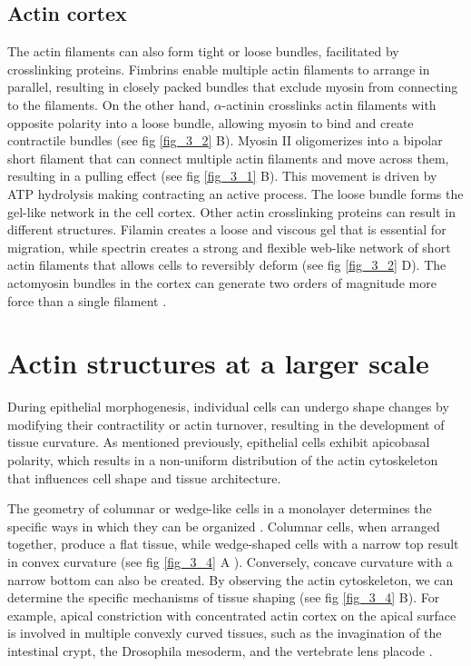 \hypertarget{actin-cortex}{%
	\subsection{Actin cortex}\label{actin-cortex}}

The actin filaments can also form tight or loose bundles, facilitated by crosslinking proteins. Fimbrins enable multiple actin filaments to arrange in parallel, resulting in closely packed bundles that exclude myosin from connecting to the filaments. On the other hand, $\alpha$-actinin crosslinks actin filaments with opposite polarity into a loose bundle, allowing myosin to bind and create contractile bundles (see fig \ref{fig_3_2} B). Myosin II oligomerizes into a bipolar short filament that can connect multiple actin filaments and move across them, resulting in a pulling effect (see fig \ref{fig_3_1} B). This movement is driven by ATP hydrolysis making contracting an active process. The loose bundle forms the gel-like network in the cell cortex. Other actin crosslinking proteins can result in different structures. Filamin creates a loose and viscous gel that is essential for migration, while spectrin creates a strong and flexible web-like network of short actin filaments that allows cells to reversibly deform (see fig \ref{fig_3_2} D). The actomyosin bundles in the cortex can generate two orders of magnitude more force than a single filament \cite{clarke2021}.


\hypertarget{actin-structures-at-a-larger-scale}{%
\section{Actin structures at a larger scale}\label{actin-structures-at-a-larger-scale}}

During epithelial morphogenesis, individual cells can undergo shape changes by modifying their contractility or actin turnover, resulting in the development of tissue curvature. As mentioned previously, epithelial cells exhibit apicobasal polarity, which results in a non-uniform distribution of the actin cytoskeleton that influences cell shape and tissue architecture.

The geometry of columnar or wedge-like cells in a monolayer determines the specific ways in which they can be organized \cite{gomez-galvez2021}. Columnar cells, when arranged together, produce a flat tissue, while wedge-shaped cells with a narrow top result in convex curvature (see fig \ref{fig_3_4} A ). Conversely, concave curvature with a narrow bottom can also be created. By observing the actin cytoskeleton, we can determine the specific mechanisms of tissue shaping (see fig \ref{fig_3_4} B). For example, apical constriction with concentrated actin cortex on the apical surface is involved in multiple convexly curved tissues, such as the invagination of the intestinal crypt, the Drosophila mesoderm, and the vertebrate lens placode \cite{perez-gonzalez2021, lecuit2011, houssin2020}.

